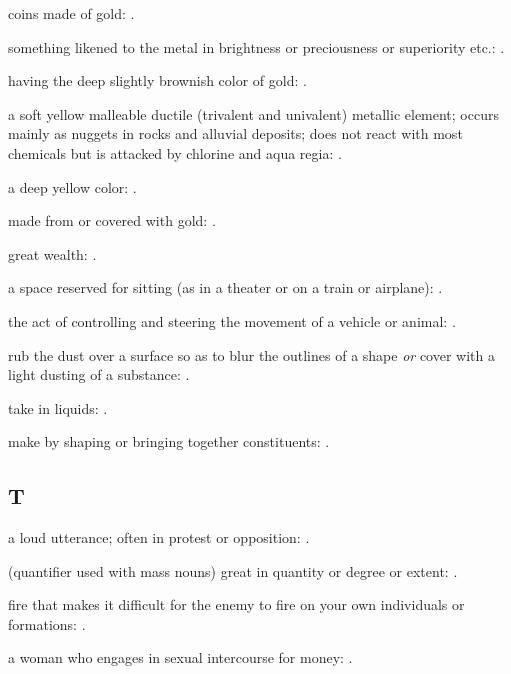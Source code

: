   coins made of gold: .

  something likened to the metal in brightness or preciousness or superiority etc.: .

  having the deep slightly brownish color of gold: .

  a soft yellow malleable ductile (trivalent and univalent) metallic element; occurs mainly as nuggets in rocks and alluvial deposits; does not react with most chemicals but is attacked by chlorine and aqua regia: .

  a deep yellow color: .

  made from or covered with gold: .

  great wealth: .

  a space reserved for sitting (as in a theater or on a train or airplane):   .

  the act of controlling and steering the movement of a vehicle or animal: .

  rub the dust over a surface so as to blur the outlines of a shape \textit{or} cover with a light dusting of a substance: .

  take in liquids:   .

  make by shaping or bringing together constituents: .

\subsection*{T}

  a loud utterance; often in protest or opposition:   .

  (quantifier used with mass nouns) great in quantity or degree or extent: .

  fire that makes it difficult for the enemy to fire on your own individuals or formations:   .

  a woman who engages in sexual intercourse for money:   .

